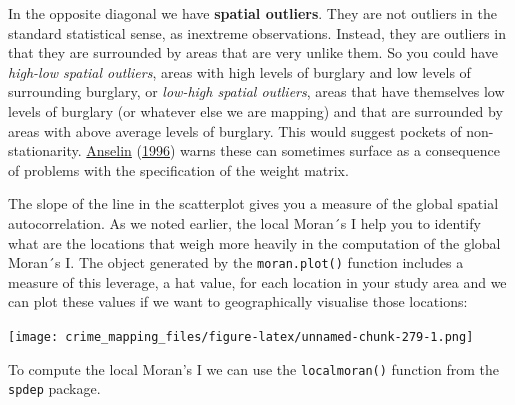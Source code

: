 \documentclass[
  krantz2]{krantz}
\makeatletter
\newenvironment{Shaded}{\begin{snugshade}}{\end{snugshade}}
\newcommand{\AttributeTok}[1]{\textcolor[rgb]{0.61,0.61,0.61}{#1}}
\newcommand{\CommentTok}[1]{\textcolor[rgb]{0.37,0.37,0.37}{\textit{#1}}}
\newcommand{\FunctionTok}[1]{\textcolor[rgb]{0,0,0}{#1}}
\newcommand{\NormalTok}[1]{#1}
\newcommand{\OtherTok}[1]{\textcolor[rgb]{0.37,0.37,0.37}{#1}}
\newcommand{\SpecialCharTok}[1]{\textcolor[rgb]{0,0,0}{#1}}
\newcommand{\StringTok}[1]{\textcolor[rgb]{0.5,0.5,0.5}{#1}}
\newenvironment{kframe}{%
\medskip{}
\setlength{\fboxsep}{.8em}
 \def\at@end@of@kframe{}%
 \ifinner\ifhmode%
  \def\at@end@of@kframe{\end{minipage}}%
  \begin{minipage}{\columnwidth}%
 \fi\fi%
 \def\FrameCommand##1{\hskip\@totalleftmargin \hskip-\fboxsep
 \colorbox{shadecolor}{##1}\hskip-\fboxsep
     \hskip-\linewidth \hskip-\@totalleftmargin \hskip\columnwidth}%
 \MakeFramed {\advance\hsize-\width
   \@totalleftmargin\z@ \linewidth\hsize
   \@setminipage}}%
 {\par\unskip\endMakeFramed%
 \at@end@of@kframe}
\renewenvironment{Shaded}{\begin{kframe}}{\end{kframe}}
\makeatother
\begin{document}
In the opposite diagonal we have \textbf{spatial outliers}. They are not outliers in the standard statistical sense, as inextreme observations. Instead, they are outliers in that they are surrounded by areas that are very unlike them. So you could have \emph{high-low spatial outliers}, areas with high levels of burglary and low levels of surrounding burglary, or \emph{low-high spatial outliers}, areas that have themselves low levels of burglary (or whatever else we are mapping) and that are surrounded by areas with above average levels of burglary. This would suggest pockets of non-stationarity. \protect\hyperlink{ref-Anselin_1996}{Anselin} (\protect\hyperlink{ref-Anselin_1996}{1996}) warns these can sometimes surface as a consequence of problems with the specification of the weight matrix.

The slope of the line in the scatterplot gives you a measure of the global spatial autocorrelation. As we noted earlier, the local Moran´s I help you to identify what are the locations that weigh more heavily in the computation of the global Moran´s I. The object generated by the \texttt{moran.plot()} function includes a measure of this leverage, a hat value, for each location in your study area and we can plot these values if we want to geographically visualise those locations:

\begin{Shaded}
\end{Shaded}

\texttt{[image: crime\_mapping\_files/figure-latex/unnamed-chunk-279-1.png]}

To compute the local Moran's I we can use the \texttt{localmoran()} function from the \texttt{spdep} package.

\begin{Shaded}
\end{Shaded}
\end{document}
